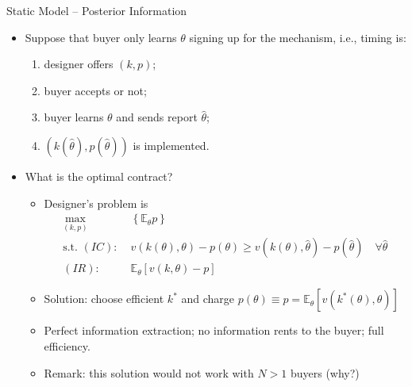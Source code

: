 \documentclass[english,10pt
,aspectratio=169
]{beamer}
\begin{document}
\begin{frame}{Static Model -- Posterior Information}
\begin{example}
	\begin{itemize}
		\item Suppose that buyer only learns $\theta$  signing up for the mechanism, i.e., timing is:
		\begin{enumerate}
			\item designer offers $(k,p)$;
			\item buyer accepts or not;
			\item buyer learns $\theta$ and sends report $\hat{\theta}$;
			\item $(k(\hat{\theta}),p(\hat{\theta}))$ is implemented.
		\end{enumerate}
		\item What is the optimal contract?
		\begin{itemize}
			\item Designer's problem is
			\begin{align*}
				\max_{(k,p)} &\;\left\{ \mathbb{E}_\theta p \right\}
				\\
				\text{s.t. } (IC): &\; v(k(\theta),\theta) - p(\theta) \geq v(k(\theta),\hat{\theta}) - p(\hat{\theta}) \quad \forall\hat{\theta}
				\\
				(IR): &\; \mathbb{E}_\theta \left[v(k,\theta) - p\right]
			\end{align*}
			\item Solution: choose efficient $k^*$ and charge $p(\theta) \equiv p = \mathbb{E}_\theta \left[v(k^*(\theta),\theta)\right]$
			\item Perfect information extraction; no information rents to the buyer; full efficiency.
			\item Remark: this solution would not work with $N>1$ buyers (why?)
		\end{itemize}
	\end{itemize}
\end{example}
\end{frame}
\end{document}
